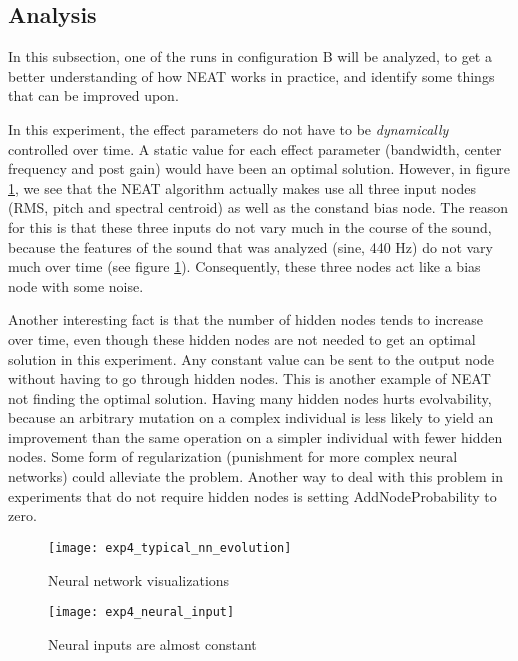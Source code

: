 \subsection{Analysis}

In this subsection, one of the runs in configuration B will be analyzed, to get a better understanding of how NEAT works in practice, and identify some things that can be improved upon.

In this experiment, the effect parameters do not have to be \textit{dynamically} controlled over time. A static value for each effect parameter (bandwidth, center frequency and post gain) would have been an optimal solution. However, in figure \ref{fig:exp4_typical_nn_evolution}, we see that the NEAT algorithm actually makes use all three input nodes (RMS, pitch and spectral centroid) as well as the constand bias node. The reason for this is that these three inputs do not vary much in the course of the sound, because the features of the sound that was analyzed (sine, 440 Hz) do not vary much over time (see figure \ref{fig:exp4_typical_nn_evolution}). Consequently, these three nodes act like a bias node with some noise.

Another interesting fact is that the number of hidden nodes tends to increase over time, even though these hidden nodes are not needed to get an optimal solution in this experiment. Any constant value can be sent to the output node without having to go through hidden nodes. This is another example of NEAT not finding the optimal solution. Having many hidden nodes hurts evolvability, because an arbitrary mutation on a complex individual is less likely to yield an improvement than the same operation on a simpler individual with fewer hidden nodes. Some form of regularization (punishment for more complex neural networks) could alleviate the problem. Another way to deal with this problem in experiments that do not require hidden nodes is setting AddNodeProbability to zero.

\begin{figure}[H]
    \centering
    \texttt{[image: exp4\_typical\_nn\_evolution]}
    \caption{Neural network visualizations}
    \label{fig:exp4_typical_nn_evolution}
\end{figure}

\begin{figure}[H]
    \centering
    \texttt{[image: exp4\_neural\_input]}
    \caption{Neural inputs are almost constant}
    \label{fig:exp4_neural_input}
\end{figure}

